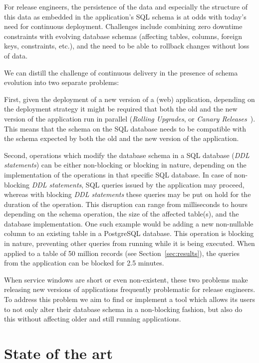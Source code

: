 \documentclass[conference]{IEEEtran}
\begin{document}
For release engineers, the persistence of the data and especially the structure of this data as embedded in the application's SQL schema is at odds with today's need for continuous deployment. Challenges include combining zero downtime constraints with evolving database schemas (affecting tables, columns, foreign keys, constraints, etc.), and the need to be able to rollback changes without loss of data.

We can distill the challenge of continuous delivery in the presence of schema evolution into two separate problems:

First, given the deployment of a new version of a (web) application, depending on the deployment strategy it might be required that both the old and the new version of the application run in parallel (\textit{Rolling Upgrades}, or \textit{Canary Releases}~\cite{Humble:2010:CDR:1869904}). This means that the schema on the SQL database needs to be compatible with the schema expected by both the old and the new version of the application.

Second, operations which modify the database schema in a SQL database (\textit{DDL statements}) can be either non-blocking or blocking in nature, depending on the implementation of the operations in that specific SQL database. In case of non-blocking \textit{DDL statements}, SQL queries issued by the application may proceed, whereas with blocking \textit{DDL statements} these queries may be put on hold for the duration of the operation. This disruption can range from milliseconds to hours depending on the schema operation, the size of the affected table(s), and the database implementation. One such example would be adding a new non-nullable column to an existing table in a PostgreSQL database. This operation is blocking in nature, preventing other queries from running while it is being executed. When applied to a table of 50 million records (see Section~\ref{sec:results}), the queries from the application can be blocked for 2.5 minutes.


When service windows are short or even non-existent, these two problems make releasing new versions of applications frequently problematic for release engineers. To address this problem we aim to find or implement a tool which  allows its users to not only alter their database schema in a non-blocking fashion, but also do this without affecting older and still running applications.

\section{State of the art} %
\end{document}
